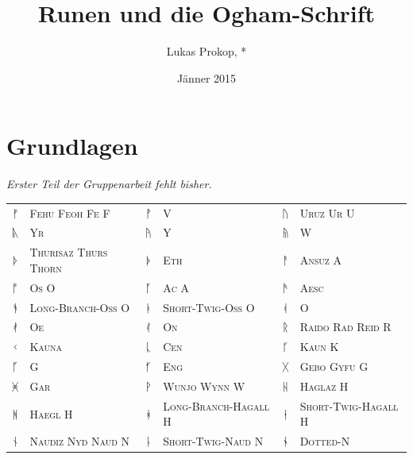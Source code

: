 \documentclass[a4paper]{scrartcl}
\author{Lukas Prokop, *}
\title{Runen und die Ogham-Schrift}
\date{Jänner 2015}
\begin{document}
\maketitle
\tableofcontents

\section{Grundlagen}

\emph{Erster Teil der Gruppenarbeit fehlt bisher.}

\begin{table}[p]
  \small
  \begin{center}
    \begin{tabular}{clclcl}
      {\runicfont ᚠ} & \textsc{Fehu Feoh Fe F} &
      {\runicfont ᚡ} & \textsc{V} &
      {\runicfont ᚢ} & \textsc{Uruz Ur U} \\
      {\runicfont ᚣ} & \textsc{Yr} &
      {\runicfont ᚤ} & \textsc{Y} &
      {\runicfont ᚥ} & \textsc{W} \\
      {\runicfont ᚦ} & \textsc{Thurisaz Thurs Thorn} &
      {\runicfont ᚧ} & \textsc{Eth} &
      {\runicfont ᚨ} & \textsc{Ansuz A} \\
      {\runicfont ᚩ} & \textsc{Os O} &
      {\runicfont ᚪ} & \textsc{Ac A} &
      {\runicfont ᚫ} & \textsc{Aesc} \\
      {\runicfont ᚬ} & \textsc{Long-Branch-Oss O} &
      {\runicfont ᚭ} & \textsc{Short-Twig-Oss O} &
      {\runicfont ᚮ} & \textsc{O} \\
      {\runicfont ᚯ} & \textsc{Oe} &
      {\runicfont ᚰ} & \textsc{On} &
      {\runicfont ᚱ} & \textsc{Raido Rad Reid R} \\
      {\runicfont ᚲ} & \textsc{Kauna} &
      {\runicfont ᚳ} & \textsc{Cen} &
      {\runicfont ᚴ} & \textsc{Kaun K} \\
      {\runicfont ᚵ} & \textsc{G} &
      {\runicfont ᚶ} & \textsc{Eng} &
      {\runicfont ᚷ} & \textsc{Gebo Gyfu G} \\
      {\runicfont ᚸ} & \textsc{Gar} &
      {\runicfont ᚹ} & \textsc{Wunjo Wynn W} &
      {\runicfont ᚺ} & \textsc{Haglaz H} \\
      {\runicfont ᚻ} & \textsc{Haegl H} &
      {\runicfont ᚼ} & \textsc{Long-Branch-Hagall H} &
      {\runicfont ᚽ} & \textsc{Short-Twig-Hagall H} \\
      {\runicfont ᚾ} & \textsc{Naudiz Nyd Naud N} &
      {\runicfont ᚿ} & \textsc{Short-Twig-Naud N} &
      {\runicfont ᛀ} & \textsc{Dotted-N} \\

\end{tabular}
\end{center}
\end{table}
\end{document}

